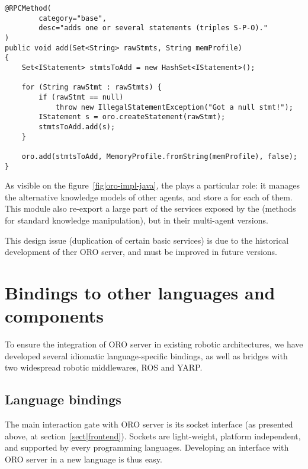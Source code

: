 \lstset{language=java}
\begin{lstlisting}[caption=The {\tt add} method from ORO {\tt BaseModule}, 
                   label = code|oro-add, 
                   morekeywords={@RPCMethod}]
@RPCMethod(
        category="base",
        desc="adds one or several statements (triples S-P-O)."
)
public void add(Set<String> rawStmts, String memProfile)
{
    Set<IStatement> stmtsToAdd = new HashSet<IStatement>();
    
    for (String rawStmt : rawStmts) {
        if (rawStmt == null)
            throw new IllegalStatementException("Got a null stmt!");
        IStatement s = oro.createStatement(rawStmt);
        stmtsToAdd.add(s);
    }
    
    oro.add(stmtsToAdd, MemoryProfile.fromString(memProfile), false);
}
\end{lstlisting}

As visible on the figure~\ref{fig|oro-impl-java}, the 
plays a particular role: it manages the alternative knowledge models of other
agents, and store a  for each of them. This module
also re-export a large part of the services exposed by the 
(methods for standard knowledge manipulation), but in their multi-agent
versions.

This design issue (duplication of certain basic services) is due to the
historical development of ther ORO server, and must be improved in future
versions.

\section{Bindings to other languages and components}
\label{sect|interfacing}

To ensure the integration of ORO server in existing robotic architectures, we
have developed several idiomatic language-specific bindings, as well as bridges
with two widespread robotic middlewares, ROS and YARP.

\subsection{Language bindings}
\label{sect|bindings}

The main interaction gate with ORO server is its socket interface (as presented
above, at section~\ref{sect|frontend}). Sockets are light-weight, platform
independent, and supported by every programming languages.  Developing an
interface with ORO server in a new language is thus easy.

